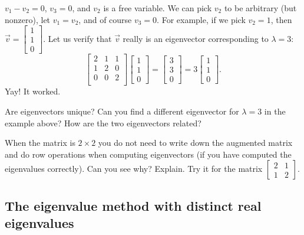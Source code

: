 \documentclass[12pt]{book}
\begin{document}
\begin{example}
$v_1 - v_2 = 0$, $v_3 = 0$, and $v_2$ is a free variable.  
We can pick $v_2$ to be arbitrary (but nonzero), let
$v_1 = v_2$, and of course $v_3 = 0$.
For example, if we pick $v_2 = 1$, then
$\vec{v} =
\left[ \begin{smallmatrix} 1 \\ 1 \\ 0 \end{smallmatrix} \right]$.
Let us verify that $\vec{v}$ really is an eigenvector corresponding to $\lambda = 3$:
\begin{equation*}
\begin{bmatrix}
2 & 1 & 1 \\
1 & 2 & 0 \\
0 & 0 & 2 \\
\end{bmatrix}
\begin{bmatrix}
1 \\
1 \\
0
\end{bmatrix}
=
\begin{bmatrix}
3 \\
3 \\
0
\end{bmatrix}
=
3
\begin{bmatrix}
1 \\
1 \\
0
\end{bmatrix} .
\end{equation*}
Yay!  It worked.
\end{example}

\begin{exercise}[easy]
Are eigenvectors unique?  Can you find a different eigenvector for
$\lambda = 3$ in the example above?  How are the two eigenvectors related?
\end{exercise}

\begin{exercise}
When the matrix is $2 \times 2$ you do not need to write
down the augmented matrix and do row operations when computing eigenvectors
(if you have computed the eigenvalues correctly).
Can you see why?  Explain.  Try it for the matrix
$\left[ \begin{smallmatrix} 2 & 1 \\ 1 & 2 \end{smallmatrix} \right]$.
\end{exercise}

\subsection{The eigenvalue method with distinct real eigenvalues}
\end{document}
